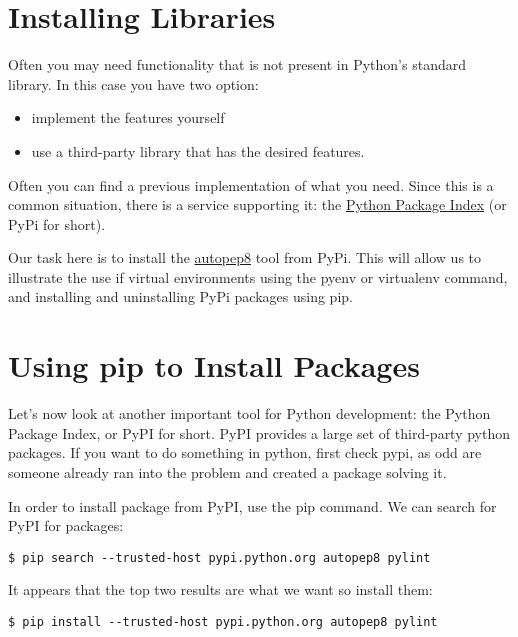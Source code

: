 


\section{Installing Libraries}\label{installing-libraries}

Often you may need functionality that is not present in Python's
standard library. In this case you have two option:

\begin{itemize}
\item  implement the features yourself
\item  use a third-party library that has the desired features.
\end{itemize}

Often you can find a previous implementation of what you need. Since
this is a common situation, there is a service supporting it: the
\href{https://pypi.python.org/pypi}{Python Package Index} (or PyPi for
short).

Our task here is to install the \href{}{autopep8} tool from PyPi. This
will allow us to illustrate the use if virtual environments using the
pyenv or virtualenv command, and installing and uninstalling PyPi
packages using pip.

\section{Using pip to Install
Packages}\label{using-pip-to-install-packages}

Let's now look at another important tool for Python development: the
Python Package Index, or PyPI for short. PyPI provides a large set of
third-party python packages. If you want to do something in python,
first check pypi, as odd are someone already ran into the problem and
created a package solving it.

In order to install package from PyPI, use the pip command. We can
search for PyPI for packages:

\begin{verbatim}
$ pip search --trusted-host pypi.python.org autopep8 pylint
\end{verbatim}

It appears that the top two results are what we want so install them:

\begin{verbatim}
$ pip install --trusted-host pypi.python.org autopep8 pylint
\end{verbatim}

